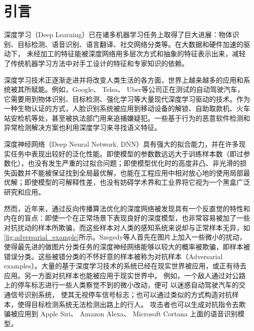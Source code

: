 \chapter{引言}

深度学习（Deep Learning）已在诸多机器学习任务上取得了巨大进展：物体识别\cite{krizhevsky2012imagenet}、目标检测\cite{redmon2016you}、语音识别\cite{saon2015ibm}、语言翻译\cite{sutskever2014sequence}、社交网络分类\cite{thomax2017semisupervised}等。在大数据和硬件加速的驱动下， 未经加工的特征能被深度网络用多层次方式和抽象的特征表示出来，减轻了传统机器学习方法中对手工设计的特征和专家知识的依赖。

深度学习技术正逐渐走进并将改变人类生活的各方面，世界上越来越多的应用和系统被其所赋能。例如，Google、 Telsa、 Uber等公司正在测试的自动驾驶汽车，它需要用到物体识别、目标检测、强化学习等大量现代深度学习驱动的技术。作为一种生物认证的方式，人脸识别系统被应用到移动设备的解锁、自助取款机、火车站安检机等处，甚至被执法部门用来追捕嫌疑犯。一些基于行为的恶意软件检测和异常检测解决方案也利用深度学习来寻找语义特征\cite{saxe2015deep}。

深度神经网络（Deep Neural Network, DNN）具有强大的拟合能力，并在许多现实任务中表现出较好的泛化性能。即使模型的参数数远远大于训练样本数（即过参数化），也没有发生严重的过拟合问题；即使模型优化时的高度非凸、非光滑的损失函数并不能被保证找到全局最优解，也能在工程应用中相对放心地的使用局部最优解；即使模型的可解释性差，也没有妨碍学术界和工业界将它视为一个黑盒广泛研究和应用。

然而，近年来，通过反向传播算法优化的深度网络被发现具有一个反直觉的特性和内在的盲点：即使一个在正常场景下表现良好的深度模型，也非常容易被加了一些对抗扰动的样本所欺骗，而这些样本对人类的感知系统来说却与正常样本无异\cite{goodfellow2014explaining}，如\autoref{fig:adversarial_example}所示。Szegedy等人首先在图片上加入一些微小的扰动，使得最先进的做图片分类任务的深度神经网络能够以较大的概率被欺骗，即样本被错误分类。这些被错分类的不怀好意的样本被称为对抗样本（Adversarial examples）\cite{szegedy2013intriguing}。大量的基于深度学习技术的系统已经在现实世界被应用，或正有待去应用。另一方面对抗样本也能被应用于现实世界中。 例如，一个敌人通过对公路上的停车标志进行一些人类察觉不到的微小改动，便可
以迷惑自动驾驶汽车的交通信号识别系统， 使其无视停车信号标志\cite{kurakin2016adversarial, Eykholt_2018_CVPR}；也可以通过类似的方式构造对抗样本，使得目标检测系统无法检测出路上的行人\cite{xie2017adversarial}。 攻击者也可以生成对抗指令去欺骗被应用到 Apple Siri、 Amazon Alexa、 Microsoft Cortana 上面的语音识别模型\cite{carlini2016hidden, zhang2017dolphinattack}。

